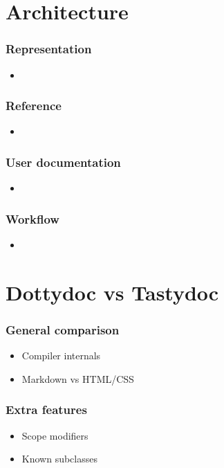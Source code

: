 \documentclass{beamer}
\begin{document}
\section{Architecture}

\begin{frame}
  \frametitle{Representation}
  \begin{itemize}
    \item 
  \end{itemize}
\end{frame}

\begin{frame}
  \frametitle{Reference}
  \begin{itemize}
    \item 
  \end{itemize}
\end{frame}

\begin{frame}
  \frametitle{User documentation}
  \begin{itemize}
    \item 
  \end{itemize}
\end{frame}

\begin{frame}
  \frametitle{Workflow}
  \begin{itemize}
    \item 
  \end{itemize}
\end{frame}

\section{Dottydoc vs Tastydoc}

\begin{frame}
  \frametitle{General comparison}
  \begin{itemize}
    \item Compiler internals \pause
    \item Markdown vs HTML/CSS
  \end{itemize}
\end{frame}

\begin{frame}
  \frametitle{Extra features}
  \begin{itemize}
    \item Scope modifiers \pause
    \item Known subclasses
  \end{itemize}
\end{frame}
\end{document}
